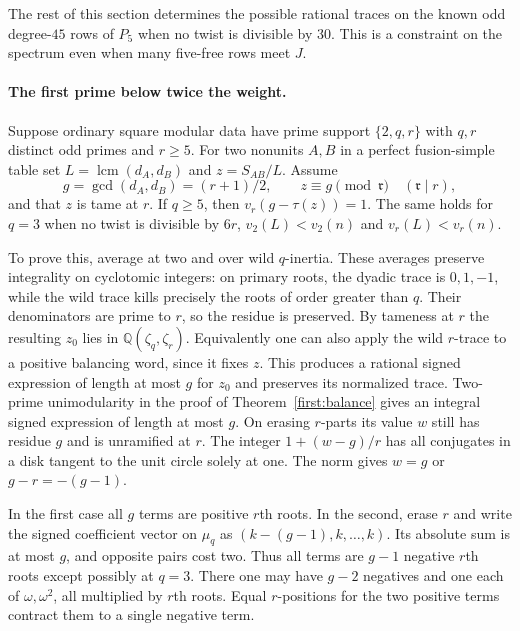 \documentclass[11pt,a4paper]{article}
\numberwithin{equation}{section}
\theoremstyle{remark}
\begin{document}
The rest of this section determines the possible rational traces on the known odd degree-$45$ rows of $P_5$ when no twist is divisible by $30$. This is a constraint on the spectrum even when many five-free rows meet $J$.

\paragraph{The first prime below twice the weight.}
Suppose ordinary square modular data have prime support $\{2,q,r\}$ with $q,r$ distinct odd primes and $r\ge5$. For two nonunits $A,B$ in a perfect fusion-simple table set $L=\operatorname{lcm}(d_A,d_B)$ and $z=S_{AB}/L$. Assume
\[
 g=\gcd(d_A,d_B)=(r+1)/2,\qquad z\equiv g\pmod {\mathfrak r}\quad(\mathfrak r\mid r),
\]
and that $z$ is tame at $r$. If $q\ge5$, then $v_r(g-\tau(z))=1$. The same holds for $q=3$ when no twist is divisible by $6r$, $v_2(L)<v_2(n)$ and $v_r(L)<v_r(n)$.

To prove this, average at two and over wild $q$-inertia. These averages preserve integrality on cyclotomic integers: on primary roots, the dyadic trace is $0,1,-1$, while the wild trace kills precisely the roots of order greater than $q$. Their denominators are prime to $r$, so the residue is preserved. By tameness at $r$ the resulting $z_0$ lies in $\mathbb Q(\zeta_q,\zeta_r)$. Equivalently one can also apply the wild $r$-trace to a positive balancing word, since it fixes $z$. This produces a rational signed expression of length at most $g$ for $z_0$ and preserves its normalized trace. Two-prime unimodularity in the proof of Theorem~\ref{first:balance} gives an integral signed expression of length at most $g$. On erasing $r$-parts its value $w$ still has residue $g$ and is unramified at $r$. The integer $1+(w-g)/r$ has all conjugates in a disk tangent to the unit circle solely at one. The norm gives $w=g$ or $g-r=-(g-1)$.

In the first case all $g$ terms are positive $r$th roots. In the second, erase $r$ and write the signed coefficient vector on $\mu_q$ as $(k-(g-1),k,\ldots,k)$. Its absolute sum is at most $g$, and opposite pairs cost two. Thus all terms are $g-1$ negative $r$th roots except possibly at $q=3$. There one may have $g-2$ negatives and one each of $\omega,\omega^2$, all multiplied by $r$th roots. Equal $r$-positions for the two positive terms contract them to a single negative term.
\end{document}
